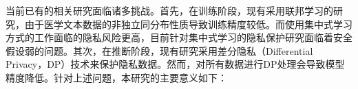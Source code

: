 %


当前已有的相关研究面临诸多挑战。首先，在训练阶段，现有采用联邦学习的研究，由于医学文本数据的非独立同分布性质导致训练精度较低\cite{CC_FL, FL_Medical_Relation_Extraction, FL_CMF}。而使用集中式学习方式的工作面临的隐私风险更高，目前针对集中式学习的隐私保护研究面临着安全假设弱的问题\cite{SecureNLP, SecureNN, secgnn, Cryptflow}。其次，在推断阶段，现有研究采用差分隐私（Differential Privacy，DP）技术\cite{DP}来保护隐私数据。然而，对所有数据进行DP处理会导致模型精度降低\cite{DP_Text_Analytics}。针对上述问题，本研究的主要意义如下：


